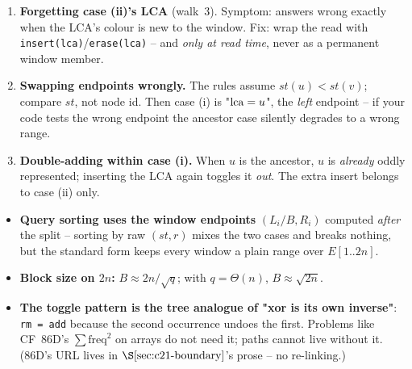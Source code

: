 \begin{warningbox}
\begin{enumerate}[nosep,leftmargin=1.6em]
  \item \textbf{Forgetting case (ii)'s LCA} (walk~3).  Symptom: answers wrong
        exactly when the LCA's colour is new to the window.  Fix: wrap the
        read with \texttt{insert(lca)}/\texttt{erase(lca)} -- and \emph{only at
        read time}, never as a permanent window member.
  \item \textbf{Swapping endpoints wrongly.} The rules assume \(st(u)<st(v)\);
        compare \(st\), not node id.  Then case (i) is "\(\operatorname{lca} = u\)", the
        \emph{left} endpoint -- if your code tests the wrong endpoint the
        ancestor case silently degrades to a wrong range.
  \item \textbf{Double-adding within case (i).} When \(u\) is the ancestor,
        \(u\) is \emph{already} oddly represented; inserting the LCA again
        toggles it \emph{out}.  The extra insert belongs to case (ii) only.
\end{enumerate}
\end{warningbox}

\begin{hardeningbox}
\begin{itemize}[nosep,leftmargin=1.4em]
  \item \textbf{Query sorting uses the window endpoints} \((L_i/B, R_i)\)
        computed \emph{after} the split -- sorting by raw \((st,r)\) mixes the
        two cases and breaks nothing, but the standard form keeps every window
        a plain range over \(E[1..2n]\).
  \item \textbf{Block size on \(2n\):} \(B \approx 2n/\sqrt q\); with
        \(q=\Theta(n)\), \(B\approx\sqrt{2n}\).
  \item \textbf{The toggle pattern is the tree analogue of "xor is its own
        inverse"}: \texttt{rm = add} because the second occurrence undoes the
        first.  Problems like CF~86D's \(\sum\mathrm{freq}^2\) on arrays do not
        need it; paths cannot live without it.  (86D's URL lives in
        \(\secref{c21-boundary}\)'s prose -- no re-linking.)
\end{itemize}
\end{hardeningbox}

